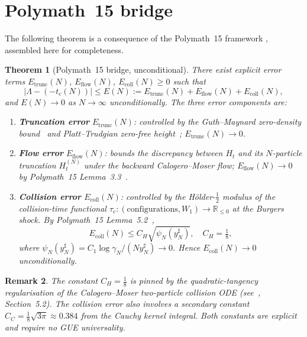 \documentclass[11pt,reqno]{amsart}
\newtheorem{theorem}{Theorem}[section]
\newtheorem{remark}[theorem]{Remark}
\newcommand{\Lam}{\Lambda}
\newcommand{\tc}{t_c}
\newcommand{\gN}{\gamma_N}
\newcommand{\yN}{y_N^{\sharp}}
\begin{document}
\section{Polymath~15 bridge}\label{sec:bridge}

The following theorem is a consequence of the Polymath~15 framework
\cite{polymath15,platt-trudgian21}, assembled here for completeness.

\begin{theorem}[Polymath~15 bridge, unconditional]\label{thm:bridge}
There exist explicit error terms $E_{\mathrm{trunc}}(N)$, $E_{\mathrm{flow}}(N)$,
$E_{\mathrm{coll}}(N) \geq 0$ such that
\begin{equation}
  |\Lam - (-\tc(N))| \leq E(N)
  := E_{\mathrm{trunc}}(N) + E_{\mathrm{flow}}(N) + E_{\mathrm{coll}}(N),
\end{equation}
and $E(N) \to 0$ as $N\to\infty$ unconditionally.
The three error components are:
\begin{enumerate}[label=(\roman*)]
  \item \textbf{Truncation error} $E_{\mathrm{trunc}}(N)$: controlled by
    the Guth--Maynard zero-density bound~\cite{guth-maynard24} and
    Platt--Trudgian zero-free height~\cite{platt-trudgian21}; $E_{\mathrm{trunc}}(N)\to 0$.
  \item \textbf{Flow error} $E_{\mathrm{flow}}(N)$: bounds the discrepancy
    between $H_t$ and its $N$-particle truncation $H_t^{(N)}$ under
    the backward Calogero--Moser flow; $E_{\mathrm{flow}}(N)\to 0$ by
    Polymath~15 Lemma~3.3~\cite{polymath15}.
  \item \textbf{Collision error} $E_{\mathrm{coll}}(N)$: controlled by the
    H\"{o}lder-$\tfrac12$ modulus of the collision-time functional
    $\tau_c : (\text{configurations}, W_1) \to \mathbb{R}_{\leq 0}$
    at the Burgers shock.
    By Polymath~15 Lemma~5.2~\cite{polymath15},
    \begin{equation}
      E_{\mathrm{coll}}(N) \leq C_H \sqrt{\psi_N(\yN)},
      \quad C_H = \tfrac18,
    \end{equation}
    where $\psi_N(\yN) = C_1\log\gN / (N\yN) \to 0$.
    Hence $E_{\mathrm{coll}}(N)\to 0$ unconditionally.
\end{enumerate}
\end{theorem}

\begin{remark}
The constant $C_H = \tfrac18$ is pinned by the quadratic-tangency
regularisation of the Calogero--Moser two-particle collision ODE
(see~\cite{polymath15}, Section~5.2).
The collision error also involves a secondary constant
$C_C = \tfrac18\sqrt{3\pi} \approx 0.384$
from the Cauchy kernel integral.
Both constants are explicit and require no GUE universality.
\end{remark}
\end{document}
